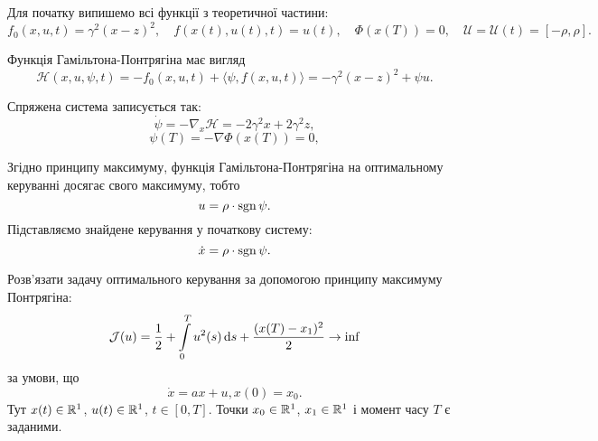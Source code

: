 \begin{solution}
    Для початку випишемо всі функції з теоретичної частини:
    \begin{equation}
        f_0(x, u, t) = \gamma^2 (x - z)^2, \quad f(x(t), u(t), t) = u(t), \quad \Phi(x(T)) = 0, \quad \mathcal{U} = \mathcal{U}(t) = [-\rho, \rho].
    \end{equation}
    
    Функція Гамільтона-Понтрягіна має вигляд
    \begin{equation}
        \mathcal{H} (x, u, \psi, t) = - f_0(x, u, t) + \langle \psi, f(x, u, t) \rangle = - \gamma^2 (x - z)^2 + \psi u.
    \end{equation}
    
    Спряжена система записується так:
    \begin{equation}
        \dot \psi = - \nabla_x \mathcal{H} = - 2 \gamma^2 x + 2 \gamma^2 z,
    \end{equation}
    \begin{equation} 
        \psi(T) = - \nabla \Phi(x(T)) = 0,
    \end{equation}
    
    Згідно принципу максимуму, функція Гамільтона-Понтрягіна на оптимальному керуванні досягає свого максимуму, тобто
    \begin{equation} 
        u = \rho \cdot \operatorname{sgn} \psi.
    \end{equation} 
    Підставляємо знайдене керування у початкову систему:
    \begin{equation}
        \dot x = \rho \cdot \operatorname{sgn} \psi.
    \end{equation}
\end{solution}

\begin{problem}
    Розв'язати задачу оптимального керування за допомогою принципу максимуму Понтрягіна:
    \begin{equation*}
        \mathcal{J}(u) = \dfrac12 + \displaystyle\int\limits_0^T u^2(s) \, \mathrm{d} s + \dfrac{(x(T) - x_1)^2}{2} \to \inf
    \end{equation*}
    за умови, що
    \begin{equation*}
        \dot x = a x + u, x(0) = x_0.
    \end{equation*}
    Тут $x(t) \in \mathbb{R}^1$, $u(t) \in \mathbb{R}^1$, $t \in [0, T]$. Точки $x_0 \in \mathbb{R}^1$, $x_1 \in \mathbb{R}^1$ і момент часу $T$ є заданими.
\end{problem}

